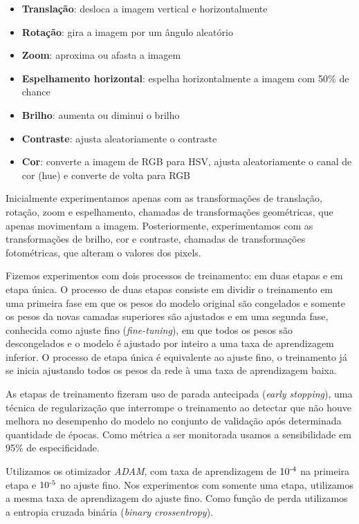 \documentclass[12pt]{article}
\begin{document}
\begin{itemize}[noitemsep]
    \item \textbf{Translação}: desloca a imagem vertical e horizontalmente
    \item \textbf{Rotação}: gira a imagem por um ângulo aleatório
    \item \textbf{Zoom}: aproxima ou afasta a imagem
    \item \textbf{Espelhamento horizontal}: espelha horizontalmente a imagem com 50\% de chance
    \item \textbf{Brilho}: aumenta ou diminui o brilho
    \item \textbf{Contraste}: ajusta aleatoriamente o contraste
    \item \textbf{Cor}: converte a imagem de RGB para HSV, ajusta aleatoriamente o canal de cor (hue) e converte de volta para RGB
\end{itemize}

Inicialmente experimentamos apenas com as transformações de translação, rotação, zoom e espelhamento, chamadas de transformações geométricas, que apenas movimentam a imagem. Posteriormente, experimentamos com as transformações de brilho, cor e contraste, chamadas de transformações fotométricas, que alteram o valores dos pixels.


Fizemos experimentos com dois processos de treinamento: em duas etapas e em etapa única. O processo de duas etapas consiste em dividir o treinamento em uma primeira fase em que os pesos do modelo original são congelados e somente os pesos da novas camadas superiores são ajustados e em uma segunda fase, conhecida como ajuste fino (\emph{fine-tuning}), em que todos os pesos são descongelados e o modelo é ajustado por inteiro a uma taxa de aprendizagem inferior. O processo de etapa única é equivalente ao ajuste fino, o treinamento já se inicia ajustando todos os pesos da rede à uma taxa de aprendizagem baixa.

As etapas de treinamento fizeram uso de parada antecipada (\emph{early stopping}), uma técnica de regularização que interrompe o treinamento ao detectar que não houve melhora no desempenho do modelo no conjunto de validação após determinada quantidade de épocas. Como métrica a ser monitorada usamos a sensibilidade em 95\% de especificidade.

Utilizamos os otimizador \emph{ADAM}, com taxa de aprendizagem de $10\textsuperscript{-4}$ na primeira etapa e $10\textsuperscript{-5}$ no ajuste fino. Nos experimentos com somente uma etapa, utilizamos a mesma taxa de aprendizagem do ajuste fino. Como função de perda utilizamos a entropia cruzada binária (\emph{binary crossentropy}).
\end{document}
